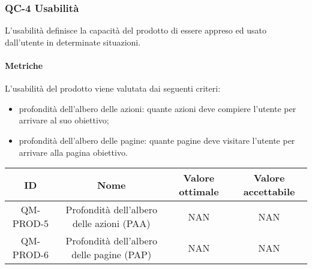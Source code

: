 \subsubsection{QC-4 Usabilità}
L'usabilità definisce la capacità del prodotto di essere appreso ed usato dall'utente in determinate situazioni.

	\paragraph{Metriche}
	L'usabilità del prodotto viene valutata dai seguenti criteri:
	\begin{itemize}
		\item profondità dell'albero delle azioni: quante azioni deve compiere l'utente per arrivare al suo obiettivo;
		\item profondità dell'albero delle pagine: quante pagine deve visitare l'utente per arrivare alla pagina obiettivo.
	\end{itemize}
	\begin{center}
		\begin{tabular}{|c|c|c|c|}
			\rowcolor{lighter-grayer}
			\hline
			ID & Nome & Valore ottimale & Valore accettabile \\
			\hline
			QM-PROD-5 & Profondità dell'albero delle azioni (PAA) & NAN & NAN \\
			\hline
			QM-PROD-6 & Profondità dell'albero delle pagine (PAP) & NAN & NAN \\
			\hline
		\end{tabular}
	\end{center}

